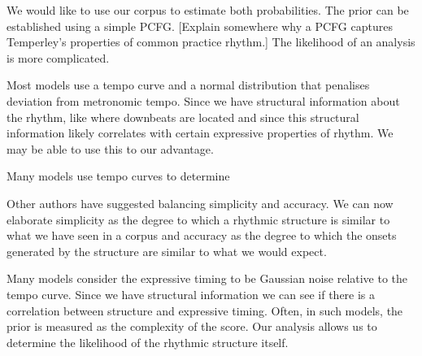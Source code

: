 \documentclass[a4paper,10pt]{article}
\begin{document}
We would like to use our corpus to estimate both probabilities. The prior can be established using a simple PCFG. [Explain somewhere why a PCFG captures Temperley's properties of common practice rhythm.] The likelihood of an analysis is more complicated.

Most models use a tempo curve and a normal distribution that penalises deviation from metronomic tempo. Since we have structural information about the rhythm, like where downbeats are located and since this structural information likely correlates with certain expressive properties of rhythm. We may be able to use this to our advantage. 

Many models use tempo curves to determine

Other authors have suggested balancing simplicity and accuracy. We can now elaborate simplicity as the degree to which a rhythmic structure is similar to what we have seen in a corpus and accuracy as the degree to which the onsets generated by the structure are similar to what we would expect.

Many models consider the expressive timing to be Gaussian noise relative to the tempo curve. Since we have structural information we can see if there is a correlation between structure and expressive timing. Often, in such models, the prior is measured as the complexity of the score. Our analysis allows us to determine the likelihood of the rhythmic structure itself. 











\end{document}
